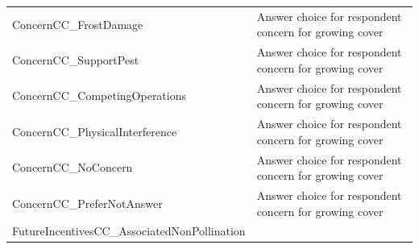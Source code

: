 \documentclass[12pt,]{article}
\begin{document}
\begin{longtable}[]{@{}ll@{}}
\begin{minipage}[t]{0.59\columnwidth}
ConcernCC\_FrostDamage\strut
\end{minipage} & \begin{minipage}[t]{0.18\columnwidth}\raggedright\strut
Answer choice for respondent concern for growing cover\strut
\end{minipage}\tabularnewline
\begin{minipage}[t]{0.59\columnwidth}\raggedright\strut
ConcernCC\_SupportPest\strut
\end{minipage} & \begin{minipage}[t]{0.18\columnwidth}\raggedright\strut
Answer choice for respondent concern for growing cover\strut
\end{minipage}\tabularnewline
\begin{minipage}[t]{0.59\columnwidth}\raggedright\strut
ConcernCC\_CompetingOperations\strut
\end{minipage} & \begin{minipage}[t]{0.18\columnwidth}\raggedright\strut
Answer choice for respondent concern for growing cover\strut
\end{minipage}\tabularnewline
\begin{minipage}[t]{0.59\columnwidth}\raggedright\strut
ConcernCC\_PhysicalInterference\strut
\end{minipage} & \begin{minipage}[t]{0.18\columnwidth}\raggedright\strut
Answer choice for respondent concern for growing cover\strut
\end{minipage}\tabularnewline
\begin{minipage}[t]{0.59\columnwidth}\raggedright\strut
ConcernCC\_NoConcern\strut
\end{minipage} & \begin{minipage}[t]{0.18\columnwidth}\raggedright\strut
Answer choice for respondent concern for growing cover\strut
\end{minipage}\tabularnewline
\begin{minipage}[t]{0.59\columnwidth}\raggedright\strut
ConcernCC\_PreferNotAnswer\strut
\end{minipage} & \begin{minipage}[t]{0.18\columnwidth}\raggedright\strut
Answer choice for respondent concern for growing cover\strut
\end{minipage}\tabularnewline
\begin{minipage}[t]{0.59\columnwidth}\raggedright\strut
FutureIncentivesCC\_AssociatedNonPollination\strut
\end{minipage} & \begin{minipage}[t]{0.18\columnwidth}\raggedright\strut

\end{minipage}
\end{longtable}
\end{document}
